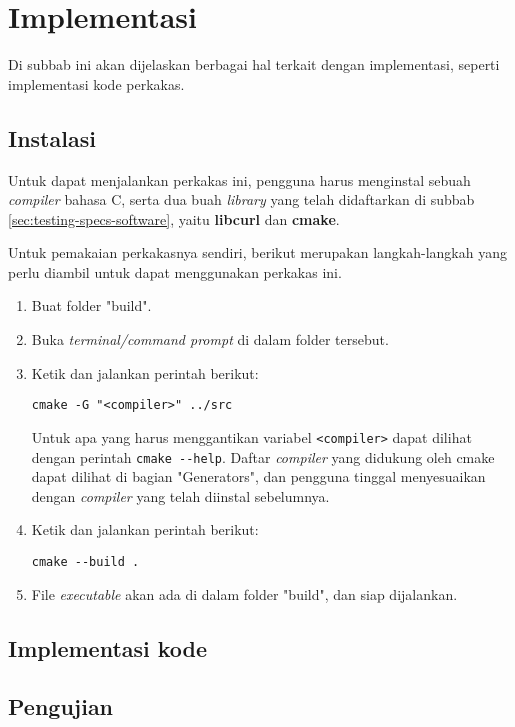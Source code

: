 \section{Implementasi}
\label{sec:testing-implementation}

Di subbab ini akan dijelaskan berbagai hal terkait dengan implementasi, seperti implementasi kode perkakas. 

\subsection{Instalasi}
\label{sec:testing-implementation-installation}

Untuk dapat menjalankan perkakas ini, pengguna harus menginstal sebuah \textit{compiler} bahasa C, serta dua buah \textit{library} yang telah didaftarkan di subbab \ref{sec:testing-specs-software}, yaitu \textbf{libcurl} dan \textbf{cmake}.

Untuk pemakaian perkakasnya sendiri, berikut merupakan langkah-langkah yang perlu diambil untuk dapat menggunakan perkakas \cl ini.

\begin{enumerate}
	\item Buat folder "build".
	\item Buka \textit{terminal/command prompt} di dalam folder tersebut.
	\item Ketik dan jalankan perintah berikut:
	\begin{verbatim}
cmake -G "<compiler>" ../src
	\end{verbatim}
	Untuk apa yang harus menggantikan variabel \verb|<compiler>| dapat dilihat dengan perintah \verb|cmake --help|. Daftar \textit{compiler} yang didukung oleh cmake dapat dilihat di bagian \mbox{"Generators"}, dan pengguna tinggal menyesuaikan dengan \textit{compiler} yang telah diinstal sebelumnya.
	\item Ketik dan jalankan perintah berikut:
	\begin{verbatim}
cmake --build .
	\end{verbatim}
	\item File \textit{executable} akan ada di dalam folder "build", dan siap dijalankan.
\end{enumerate}

\subsection{Implementasi kode}
\label{sec:testing-implementation-code}

\subsection{Pengujian}
\label{sec:testing-experiments}
